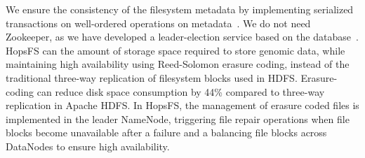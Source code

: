 


We ensure the consistency of the filesystem metadata by implementing serialized transactions on well-ordered operations on metadata~\cite{hops_consistency}. We do not need Zookeeper, as we have developed a leader-election service based on the database~\cite{hopselection}. HopsFS can the amount of storage space required to store genomic data, while maintaining high availability using Reed-Solomon erasure coding, instead of the traditional three-way replication of filesystem blocks used in HDFS. Erasure-coding can reduce disk space consumption by 44\% compared to three-way replication in Apache HDFS. In HopsFS, the management of erasure coded files is implemented in the leader NameNode, triggering file repair operations when file blocks become unavailable after a failure and a balancing file blocks across DataNodes to ensure high availability.





